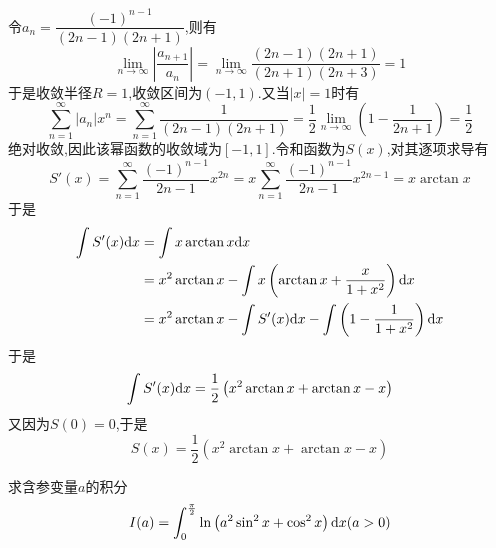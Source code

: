 \documentclass{ctexart}
\begin{document}
\begin{solution}
    令$a_n=\dfrac{(-1)^{n-1}}{(2n-1)(2n+1)}$,则有
    \[\lim_{n\to\infty}\left|\dfrac{a_{n+1}}{a_n}\right|=\lim_{n\to\infty}\dfrac{(2n-1)(2n+1)}{(2n+1)(2n+3)}=1\]
    于是收敛半径$R=1$,收敛区间为$(-1,1)$.又当$|x|=1$时有
    \[\sum_{n=1}^{\infty}\left|a_n\right|x^n=\sum_{n=1}^{\infty}\dfrac{1}{(2n-1)(2n+1)}=\dfrac12\lim_{n\to\infty}\left(1-\dfrac{1}{2n+1}\right)=\dfrac12\]
    绝对收敛,因此该幂函数的收敛域为$[-1,1]$.令和函数为$S(x)$,对其逐项求导有
    \[S'(x)=\sum_{n=1}^{\infty}\dfrac{(-1)^{n-1}}{2n-1}x^{2n}=x\sum_{n=1}^{\infty}\dfrac{(-1)^{n-1}}{2n-1}x^{2n-1}=x\arctan x\]
    于是
    \[\begin{aligned}
        \int S'(x)\mathrm{d} x
        &= \int x\arctan x\mathrm{d} x \\
        &= x^2\arctan x-\int x\left(\arctan x+\dfrac{x}{1+x^2}\right)\mathrm{d} x \\
        &= x^2\arctan x-\int S'(x)\mathrm{d} x-\int\left(1-\dfrac{1}{1+x^2}\right)\mathrm{d} x \\
    \end{aligned}\]
    于是
    \[\int S'(x)\mathrm{d} x=\dfrac12\left(x^2\arctan x+\arctan x-x\right)\]
    又因为$S(0)=0$,于是
    \[S(x)=\dfrac12\left(x^2\arctan x+\arctan x-x\right)\]

\end{solution}
\begin{problem}[4.(12\songti{分})]
    求含参变量$a$的积分
    \[I(a)=\int_0^{\frac\pi2}\ln\left(a^2\sin^2x+\cos^2x\right)\mathrm{d} x(a>0)\]
        
\end{problem}
\end{document}
